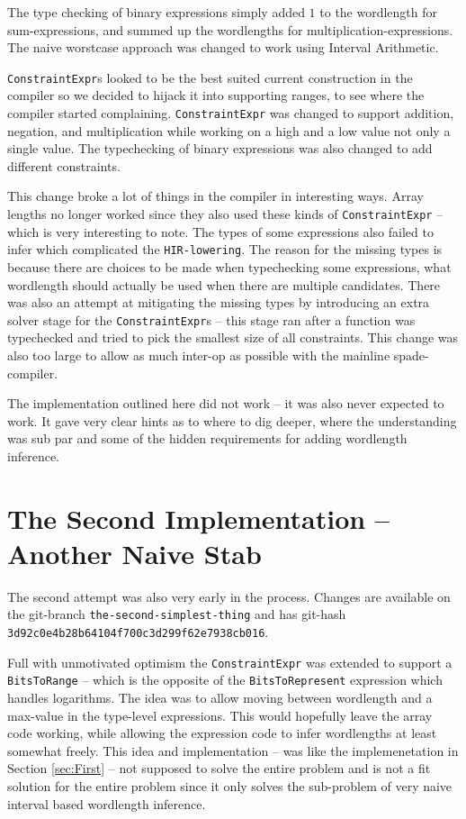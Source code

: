 \documentclass[msc,lith,english]{liuthesis}
\begin{document}
The type checking of binary expressions simply added $1$ to the wordlength for sum-expressions, and summed up the wordlengths for multiplication-expressions. The naive worstcase approach was changed to work using Interval Arithmetic. 

\verb+ConstraintExpr+s looked to be the best suited current construction in the compiler so we decided to hijack it into supporting ranges, to see where the compiler started complaining. \verb+ConstraintExpr+ was changed to support addition, negation, and multiplication while working on a high and a low value not only a single value. The typechecking of binary expressions was also changed to add different constraints.

This change broke a lot of things in the compiler in interesting ways. Array lengths no longer worked since they also used these kinds of \verb+ConstraintExpr+ -- which is very interesting to note. The types of some expressions also failed to infer which complicated the \verb+HIR-lowering+. The reason for the missing types is because there are choices to be made when typechecking some expressions, what wordlength should actually be used when there are multiple candidates. There was also an attempt at mitigating the missing types by introducing an extra solver stage for the \verb+ConstraintExpr+s -- this stage ran after a function was typechecked and tried to pick the smallest size of all constraints. This change was also too large to allow as much inter-op as possible with the mainline spade-compiler.

The implementation outlined here did not work -- it was also never expected to work. It gave very clear hints as to where to dig deeper, where the understanding was sub par and some of the hidden requirements for adding wordlength inference.

\section{The Second Implementation -- Another Naive Stab}
\label{sec:Second}
The second attempt was also very early in the process. Changes are available on the git-branch \verb+the-second-simplest-thing+ and has git-hash \verb+3d92c0e4b28b64104f700c3d299f62e7938cb016+.

Full with unmotivated optimism the \verb+ConstraintExpr+ was extended to support a \verb+BitsToRange+ -- which is the opposite of the \verb+BitsToRepresent+ expression which handles logarithms. The idea was to allow moving between wordlength and a max-value in the type-level expressions. This would hopefully leave the array code working, while allowing the expression code to infer wordlengths at least somewhat freely. This idea and implementation -- was like the implemenetation in Section \ref{sec:First} -- not supposed to solve the entire problem and is not a fit solution for the entire problem since it only solves the sub-problem of very naive interval based wordlength inference.
\end{document}
